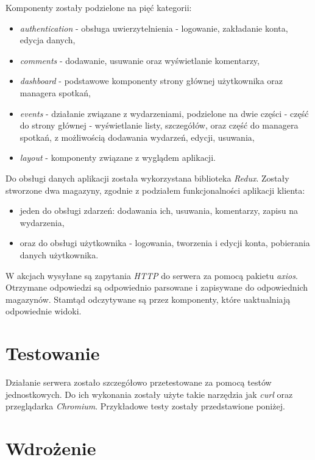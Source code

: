 \documentclass[12pt]{article}
\begin{document}
Komponenty zostały podzielone na pięć kategorii:
\begin{itemize}
\item \textit{authentication} - obsługa uwierzytelnienia - logowanie, zakładanie konta, edycja danych,
\item \textit{comments} - dodawanie, usuwanie oraz wyświetlanie komentarzy,
\item \textit{dashboard} - podstawowe komponenty strony głównej użytkownika oraz managera spotkań,
\item \textit{events} - działanie związane z wydarzeniami, podzielone na dwie części - część do strony głównej - wyświetlanie listy, szczegółów, oraz część do managera spotkań, z możliwością dodawania wydarzeń, edycji, usuwania,
\item \textit{layout} - komponenty związane z wyglądem aplikacji.
\end{itemize}

Do obsługi danych aplikacji została wykorzystana biblioteka \textit{Redux}. Zostały stworzone dwa magazyny, zgodnie z podziałem funkcjonalności aplikacji klienta: 
\begin{itemize}
\item jeden do obsługi zdarzeń: dodawania ich, usuwania, komentarzy, zapisu na wydarzenia,
\item oraz do obsługi użytkownika - logowania, tworzenia i edycji konta, pobierania danych użytkownika.
\end{itemize}

W akcjach wysyłane są zapytania \textit{HTTP} do serwera za pomocą pakietu \textit{axios}. Otrzymane odpowiedzi są odpowiednio parsowane i zapisywane do odpowiednich magazynów. Stamtąd odczytywane są przez komponenty, które uaktualniają odpowiednie widoki.

\pagebreak
\section{Testowanie}

Działanie serwera zostało szczegółowo przetestowane za pomocą testów jednostkowych. Do ich wykonania zostały użyte takie narzędzia jak \textit{curl} oraz przeglądarka \textit{Chromium}. Przykładowe testy zostały przedstawione poniżej.

\pagebreak
\section{Wdrożenie}
\end{document}
